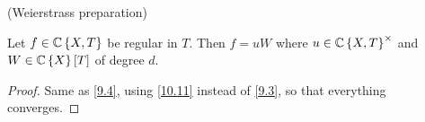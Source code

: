 \begin{cor*}
\label{10.12} (Weierstrass preparation)

Let $f\in\mathbb{C}\left\{ X,T\right\} $ be regular in $T$. Then $f=uW$
where $u\in\mathbb{C}\left\{ X,T\right\} ^{\times}$ and $W\in\mathbb{C}\left\{ X\right\} \left[T\right]$
of degree $d$.\end{cor*}
\begin{proof}
Same as \ref{9.4}, using \ref{10.11} instead of \ref{9.3}, so that everything
converges.\end{proof}